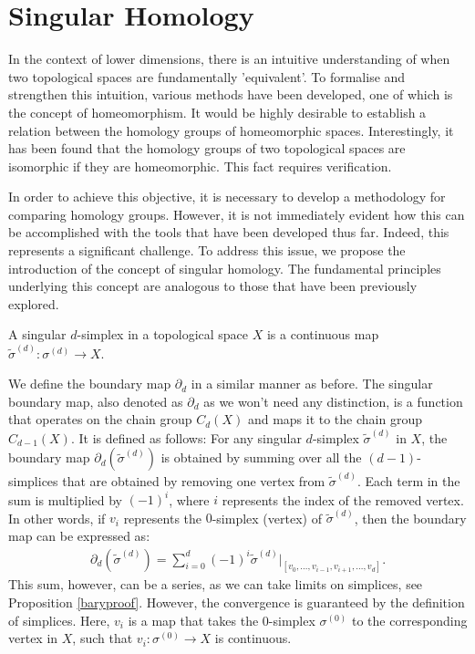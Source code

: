 \section{Singular Homology}
\label{SingularHomology}
In the context of lower dimensions, there is an intuitive understanding of when two topological spaces are fundamentally 'equivalent'. To formalise and strengthen this intuition, various methods have been developed, one of which is the concept of homeomorphism. It would be highly desirable to establish a relation between the homology groups of homeomorphic spaces. Interestingly, it has been found that the homology groups of two topological spaces are isomorphic if they are homeomorphic. This fact requires verification.

In order to achieve this objective, it is necessary to develop a methodology for comparing homology groups. However, it is not immediately evident how this can be accomplished with the tools that have been developed thus far. Indeed, this represents a significant challenge. To address this issue, we propose the introduction of the concept of singular homology. The fundamental principles underlying this concept are analogous to those that have been previously explored.

\begin{definition}
	A singular \( d \)-simplex in a topological space \( X \) is a continuous map \( \tilde{\sigma}^{(d)}: \sigma^{(d)} \to X \).
\end{definition}

We define the boundary map \( \partial_{d} \) in a similar manner as before. The singular boundary map, also denoted as \( \partial_{d} \) as we won't need any distinction, is a function that operates on the chain group \( C_{d}(X) \) and maps it to the chain group \( C_{d-1}(X) \). It is defined as follows: For any singular \( d \)-simplex \( \tilde{\sigma}^{(d)} \) in \( X \), the boundary map \( \partial_{d}(\tilde{\sigma}^{(d)}) \) is obtained by summing over all the \( (d-1) \)-simplices that are obtained by removing one vertex from \( \tilde{\sigma}^{(d)} \). Each term in the sum is multiplied by \( (-1)^{i} \), where \( i \) represents the index of the removed vertex. In other words, if \( v_{i} \) represents the \( 0 \)-simplex (vertex) of \( \tilde{\sigma}^{(d)} \), then the boundary map can be expressed as:
\begin{align}
	\partial_{d}(\tilde{\sigma}^{(d)}) = \sum_{i=0}^{d} (-1)^{i} \tilde{\sigma}^{(d)}\vert_{[v_0, \ldots, v_{i-1}, v_{i+1}, \ldots, v_d]}. 
\end{align}
This sum, however, can be a series, as we can take limits on simplices, see Proposition \ref{baryproof}. However, the convergence is guaranteed by the definition of simplices. Here, \( v_{i} \) is a map that takes the \( 0 \)-simplex \( \sigma^{(0)} \) to the corresponding vertex in \( X \), such that \( v_{i}: \sigma^{(0)} \to X \) is continuous.

